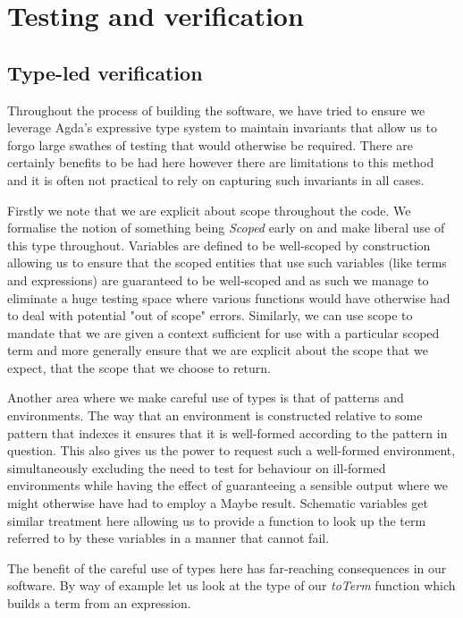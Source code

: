 \chapter{Testing and verification}
\label{chapter-testing}
\section{Type-led verification}

Throughout the process of building the software, we have tried to
ensure we leverage Agda's expressive type system to maintain
invariants that allow us to forgo large swathes of testing that would
otherwise be required. There are certainly benefits to be had here
however there are limitations to this method and it is often not
practical to rely on capturing such invariants in all cases.

Firstly we note that we are explicit about scope throughout the
code. We formalise the notion of something being \emph{Scoped} early
on and make liberal use of this type throughout. Variables are defined
to be well-scoped by construction allowing 
us to ensure that the scoped entities that use such variables (like
terms and expressions) are guaranteed to be well-scoped and as such we
manage to eliminate a huge testing space where various functions would
have otherwise had to deal with potential "out of scope"
errors. Similarly, we can use scope to mandate that we are given a
context sufficient for use with a particular scoped term and more
generally ensure that we are explicit about the scope that we expect,
that the scope that we choose to return.

Another area where we make careful use of types is that of patterns
and environments. The way that an environment is
constructed relative to some pattern that indexes it ensures that it
is well-formed according to the pattern in question. This also gives
us the power to request such a well-formed environment, simultaneously
excluding the need to test for behaviour on ill-formed environments
while having the effect of guaranteeing a sensible output where we
might otherwise have had to employ a Maybe result. Schematic variables
get similar treatment here allowing us to provide a function to look
up the term referred to by these variables in a manner that cannot
fail. 

The benefit of the careful use of types here has far-reaching
consequences in our software. By way of example let us look at the
type of our \emph{toTerm} function which builds a term from an expression.

